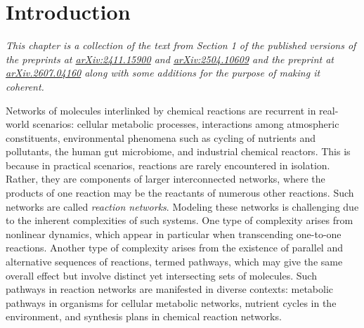 \chapter{Introduction}
\label{ch:introduction} %

{\sffamily\slshape This chapter is a collection of the text from Section 1 of the published versions of the preprints at \href{https://arxiv.org/abs/2411.15900}{arXiv:2411.15900} and \href{https://arxiv.org/abs/2504.10609}{arXiv:2504.10609} and the preprint at \href{https://arxiv.org/abs/2504.10609}{arXiv.2607.04160} along with some additions for the purpose of making it coherent.\\}

Networks of molecules interlinked by chemical reactions are recurrent in real-world scenarios: cellular metabolic processes, interactions among atmospheric constituents, environmental phenomena such as cycling of nutrients and pollutants, the human gut microbiome, and industrial chemical reactors.
This is because in practical scenarios, reactions are rarely encountered in isolation. Rather, they are components of larger interconnected networks, where the products of one reaction may be the reactants of numerous other reactions. Such networks are called \emph{reaction networks}.
Modeling these networks is challenging due to the inherent complexities of such systems.
One type of complexity arises from nonlinear dynamics, which appear in particular when transcending one-to-one reactions.
Another type of complexity arises from the existence of parallel and alternative sequences of reactions,
termed pathways, which may give the same overall effect but involve distinct yet intersecting sets of molecules.
Such pathways in reaction networks are manifested in diverse contexts:
metabolic pathways in organisms for cellular metabolic networks, nutrient cycles in the environment, and synthesis plans in chemical reaction networks.


